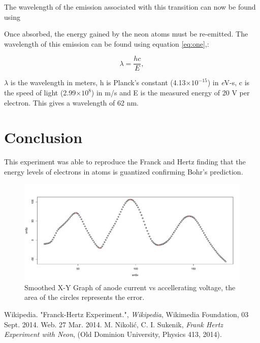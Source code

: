 \documentclass[twocolumn,secnumarabic,amssymb, nobibnotes, aps, pra]{revtex4}
\providecommand{\e}[1]{\ensuremath{\times 10^{#1}}}
\begin{document}
The wavelength of the emission associated with this transition can now be found using 

Once absorbed, the energy gained by the neon atoms must be re-emitted. The wavelength of this emission can be found using equation \ref{eq:one},:

\begin{equation}
\lambda = \frac{hc}{E},
\label{eq:one}   %
\end{equation}

 $\lambda$ is the wavelength in meters, h is Planck's constant (4.13\e{-15}) in \textit{e}V-s, c is the speed of light (2.99\e{8}) in m/s and E is the measured energy of 20 V per electron. This gives a wavelength of 62 nm.  




\section{Conclusion}

This experiment was able to reproduce the Franck and Hertz finding that the energy levels of electrons in atoms is guantized confirming Bohr's prediction.  
 


\begin{figure} [b]  %
\begin{center}
\includegraphics[scale=.5]{frankhertz.pdf} 
\end{center}
\caption{Smoothed X-Y Graph of anode current vs accellerating voltage, the area of the circles represents the error.}
\label{fig:graph}
\end{figure}


\begin{thebibliography}{5}
 Wikipedia. "Franck-Hertz Experiment.", \textit{Wikipedia}, Wikimedia Foundation, 03 Sept. 2014. Web. 27 Mar. 2014.
 M. Nikolić, C. I. Sukenik, \textit{Frank Hertz Experiment with Neon}, (Old Dominion University, Physics 413, 2014).

\end{thebibliography}
\end{document}
